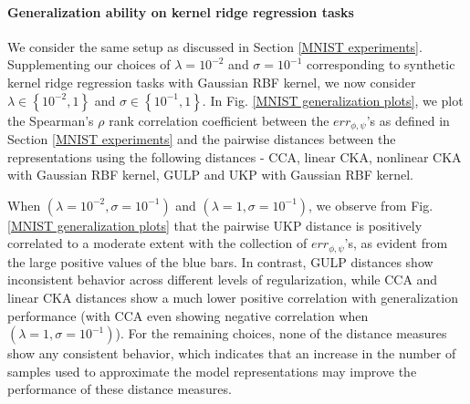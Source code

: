\documentclass{article} %
\newcommand{\repone}{\phi}
\newcommand{\reptwo}{\psi}
\newcommand{\metricstname}{UKP }
\theoremstyle{plain}
\begin{document}
\raggedbottom


\paragraph{Generalization ability on kernel ridge regression tasks}

We consider the same setup as discussed in Section \ref{MNIST experiments}. Supplementing our choices of $\lambda=10^{-2}$ and $\sigma=10^{-1}$ corresponding to synthetic kernel ridge regression tasks with Gaussian RBF kernel, we now consider $\lambda \in \left\{10^{-2},1\right\}$  and $\sigma \in \left\{10^{-1},1\right\}$. In Fig. \ref{MNIST generalization plots}, we plot the Spearman's $\rho$ rank correlation coefficient between the $err_{\repone,\reptwo}$'s as defined in Section \ref{MNIST experiments} and the pairwise distances between the representations using the following distances - CCA, linear CKA, nonlinear CKA with Gaussian RBF kernel, GULP and UKP with Gaussian RBF kernel. 

When $(\lambda = 10^{-2},\sigma = 10^{-1})$ and $(\lambda=1,\sigma=10^{-1})$, we observe from Fig. \ref{MNIST generalization plots} that the pairwise \metricstname distance is positively correlated to a moderate extent with the collection of $err_{\repone,\reptwo}$'s, as evident from the large positive values of the blue bars. In contrast, GULP distances show inconsistent behavior across different levels of regularization, while CCA and linear CKA distances show a much lower positive correlation with generalization performance (with CCA even showing negative correlation when $(\lambda=1,\sigma=10^{-1})$). For the remaining choices, none of the distance measures show any consistent behavior, which indicates that an increase in the number of samples used to approximate the model representations may improve the performance of these distance measures.

\raggedbottom
\end{document}
